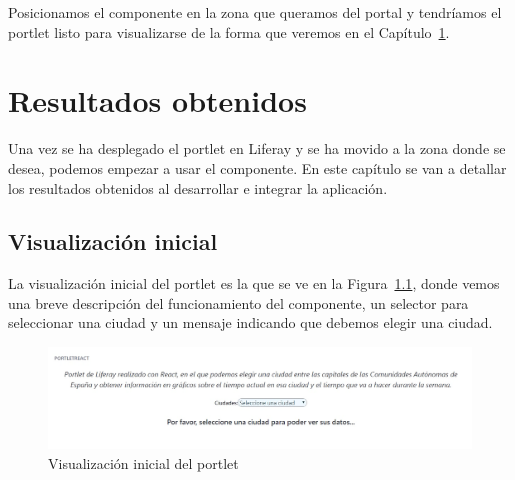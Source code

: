 \documentclass[a4paper, 12pt]{book}
\begin{document}
\vspace{5mm}
Posicionamos el componente en la zona que queramos del portal y tendríamos el portlet listo para visualizarse de la forma que veremos en el Capítulo~\ref{chap:resultados_obtenidos}.




\cleardoublepage
\chapter{Resultados obtenidos}
\label{chap:resultados_obtenidos}
Una vez se ha desplegado el portlet en Liferay y se ha movido a la zona donde se desea, podemos empezar a usar el componente. En este capítulo se van a detallar los resultados obtenidos al desarrollar e integrar la aplicación.


\section{Visualización inicial}
\label{sec:visualizacion-inicial}
La visualización inicial del portlet es la que se ve en la Figura~\ref{fig:pantalla_ini}, donde vemos una breve descripción del funcionamiento del componente, un selector para seleccionar una ciudad y un mensaje indicando que debemos elegir una ciudad.
\begin{figure}[h]
  \centering
  \includegraphics[width=15cm]{img_usadas/pantalla_ini.png}
  \caption{Visualización inicial del portlet}
  \label{fig:pantalla_ini}
\end{figure}
\end{document}
